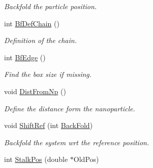 \begin{DoxyCompactItemize}
\begin{DoxyCompactList}\small\item\em \-Backfold the particle position. \end{DoxyCompactList}\item 
\hypertarget{classVarData_a0826d64fb693577d667b53d50e53abb5}{int \hyperlink{classVarData_a0826d64fb693577d667b53d50e53abb5}{\-Bf\-Def\-Chain} ()}\label{classVarData_a0826d64fb693577d667b53d50e53abb5}

\begin{DoxyCompactList}\small\item\em \-Definition of the chain. \end{DoxyCompactList}\item 
\hypertarget{classVarData_af16fce4f3d2abd5981a02ce3a9bf0ee3}{int \hyperlink{classVarData_af16fce4f3d2abd5981a02ce3a9bf0ee3}{\-Bf\-Edge} ()}\label{classVarData_af16fce4f3d2abd5981a02ce3a9bf0ee3}

\begin{DoxyCompactList}\small\item\em \-Find the box size if missing. \end{DoxyCompactList}\item 
\hypertarget{classVarData_ae1ce909c47c5e9f7aa655b443dd74af0}{void \hyperlink{classVarData_ae1ce909c47c5e9f7aa655b443dd74af0}{\-Dist\-From\-Np} ()}\label{classVarData_ae1ce909c47c5e9f7aa655b443dd74af0}

\begin{DoxyCompactList}\small\item\em \-Define the distance form the nanoparticle. \end{DoxyCompactList}\item 
\hypertarget{classVarData_a42c97b08cf848bfaa9d68951070243d2}{void \hyperlink{classVarData_a42c97b08cf848bfaa9d68951070243d2}{\-Shift\-Ref} (int \hyperlink{classVarData_a76c0ae2bedaaafb3da1cb7019035b602}{\-Back\-Fold})}\label{classVarData_a42c97b08cf848bfaa9d68951070243d2}

\begin{DoxyCompactList}\small\item\em \-Backfold the system wrt the reference position. \end{DoxyCompactList}\item 
\hypertarget{classVarData_a368f70b601610ec1c3b3155e681cfa83}{int \hyperlink{classVarData_a368f70b601610ec1c3b3155e681cfa83}{\-Stalk\-Pos} (double $\ast$\-Old\-Pos)}\label{classVarData_a368f70b601610ec1c3b3155e681cfa83}


\end{DoxyCompactItemize}
